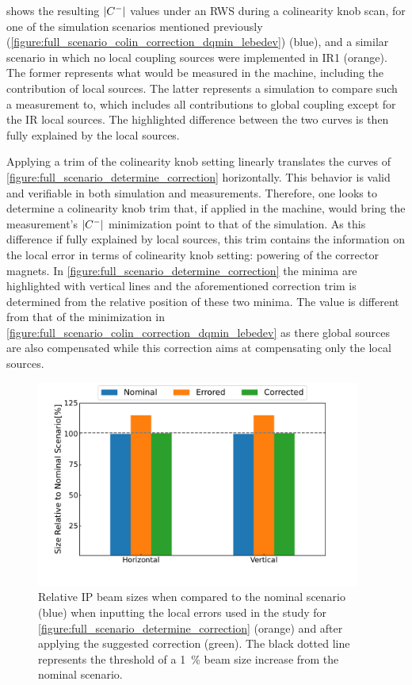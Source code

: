  shows the resulting \(\left\lvert C^{-} \right\rvert\) values under an RWS during a colinearity knob scan, for one of the simulation scenarios mentioned previously (\cref{figure:full_scenario_colin_correction_dqmin_lebedev}) (\textcolor{mplblue}{blue}), and a similar scenario in which no local coupling sources were implemented in IR\num{1} (\textcolor{mplorange}{orange}).
The former represents what would be measured in the machine, including the contribution of local sources.
The latter represents a simulation to compare such a measurement to, which includes all contributions to global coupling except for the IR local sources.
The highlighted difference between the two curves is then fully explained by the local sources.

Applying a trim of the colinearity knob setting linearly translates the curves of \cref{figure:full_scenario_determine_correction} horizontally.
This behavior is valid and verifiable in both simulation and measurements.
Therefore, one looks to determine a colinearity knob trim that, if applied in the machine, would bring the measurement's \(\left\lvert C^{-} \right\rvert\) minimization point to that of the simulation.
As this difference if fully explained by local sources, this trim contains the information on the local error in terms of colinearity knob setting: powering of the corrector magnets.
In \cref{figure:full_scenario_determine_correction} the minima are highlighted with vertical lines and the aforementioned correction trim is determined from the relative position of these two minima.
The value is different from that of the minimization in \cref{figure:full_scenario_colin_correction_dqmin_lebedev} as there global sources are also compensated while this correction aims at compensating only the local sources.

\begin{figure}[!htb]
    \centering
    \includegraphics*[width=0.95\textwidth]{Figures/IR_Coupling_Correction/full_scenario_correction_efficiency.pdf}
    \caption{Relative IP beam sizes when compared to the nominal scenario (\textcolor{mplblue}{blue}) when inputting the local errors used in the study for \cref{figure:full_scenario_determine_correction} (\textcolor{mplorange}{orange}) and after applying the suggested correction (\textcolor{mplgreen}{green}). The black dotted line represents the threshold of a \qty{1}{\percent} beam size increase from the nominal scenario.}
    \label{figure:full_scenario_correction_efficiency}
\end{figure}

